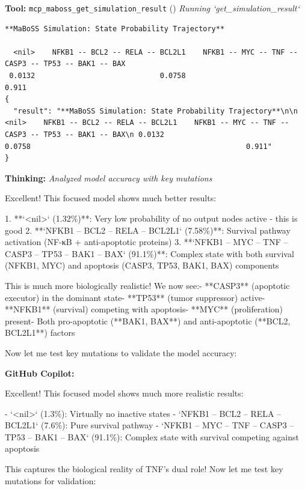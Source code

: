 \documentclass[11pt,a4paper]{article}
\begin{document}
\begin{toolokbox}
\textbf{Tool:} \texttt{mcp\_maboss\_get\_simulation\_result} (\checkmark)
\textit{Running `get\_simulation\_result`}
\begin{lstlisting}
**MaBoSS Simulation: State Probability Trajectory**

  <nil>    NFKB1 -- BCL2 -- RELA -- BCL2L1    NFKB1 -- MYC -- TNF -- CASP3 -- TP53 -- BAK1 -- BAX
 0.0132                             0.0758                                                  0.911
{
  "result": "**MaBoSS Simulation: State Probability Trajectory**\n\n  <nil>    NFKB1 -- BCL2 -- RELA -- BCL2L1    NFKB1 -- MYC -- TNF -- CASP3 -- TP53 -- BAK1 -- BAX\n 0.0132                             0.0758                                                  0.911"
}
\end{lstlisting}
\end{toolokbox}
\begin{thinkbox}
\textbf{Thinking:} \textit{Analyzed model accuracy with key mutations}

Excellent! This focused model shows much better results:

1. **`<nil>` (1.32\%)**: Very low probability of no output nodes active - this is good
2. **`NFKB1 -- BCL2 -- RELA -- BCL2L1` (7.58\%)**: Survival pathway activation (NF-κB + anti-apoptotic proteins) 
3. **`NFKB1 -- MYC -- TNF -- CASP3 -- TP53 -- BAK1 -- BAX` (91.1\%)**: Complex state with both survival (NFKB1, MYC) and apoptosis (CASP3, TP53, BAK1, BAX) components

This is much more biologically realistic! We now see:- **CASP3** (apoptotic executor) in the dominant state- **TP53** (tumor suppressor) active- **NFKB1** (survival) competing with apoptosis- **MYC** (proliferation) present- Both pro-apoptotic (**BAK1, BAX**) and anti-apoptotic (**BCL2, BCL2L1**) factors

Now let me test key mutations to validate the model accuracy:

\end{thinkbox}
\begin{copilotbox}
\textbf{GitHub Copilot:}

Excellent! This focused model shows much more realistic results:

- `<nil>` (1.3\%): Virtually no inactive states
- `NFKB1 -- BCL2 -- RELA -- BCL2L1` (7.6\%): Pure survival pathway  
- `NFKB1 -- MYC -- TNF -- CASP3 -- TP53 -- BAK1 -- BAX` (91.1\%): Complex state with survival competing against apoptosis

This captures the biological reality of TNF's dual role! Now let me test key mutations for validation:

\end{copilotbox}
\end{document}
